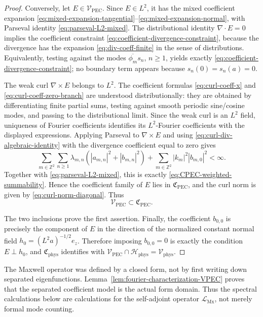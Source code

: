 \documentclass[11pt]{article}
\providecommand{\Z}{\mathbb{Z}}
\providecommand{\abs}[1]{\left\lvert #1\right\rvert}
\providecommand{\paren}[1]{\left(#1\right)}
\providecommand{\Hphys}{\mathcal H_{\mathrm{phys}}}
\providecommand{\VPEC}{\mathcal V_{\mathrm{PEC}}}
\providecommand{\Vphys}{\mathcal V_{\mathrm{phys}}}
\providecommand{\hzero}{h_0}
\providecommand{\LMx}{\mathcal L_{\mathrm{Mx}}}
\numberwithin{equation}{section}
\begin{document}
\begin{proof}
Conversely, let \(E\in\VPEC\).  Since \(E\in L^2\), it has the mixed coefficient expansion \eqref{eq:mixed-expansion-tangential}--\eqref{eq:mixed-expansion-normal}, with Parseval identity \eqref{eq:parseval-L2-mixed}.  The distributional identity \(\nabla\cdot E=0\) implies the coefficient constraint \eqref{eq:coefficient-divergence-constraint}, because the divergence has the expansion \eqref{eq:div-coeff-finite} in the sense of distributions.  Equivalently, testing against the modes \(\overline{\phi_m}s_n\), \(n\ge1\), yields exactly \eqref{eq:coefficient-divergence-constraint}; no boundary term appears because \(s_n(0)=s_n(a)=0\).

The weak curl \(\nabla\times E\) belongs to \(L^2\).  The coefficient formulas
\eqref{eq:curl-coeff-x} and \eqref{eq:curl-coeff-zero-branch} are understood
distributionally: they are obtained by differentiating finite partial sums,
testing against smooth periodic sine/cosine modes, and passing to the
distributional limit.  Since the weak curl is an \(L^2\) field, uniqueness of
Fourier coefficients identifies its \(L^2\)-Fourier coefficients with the
displayed expressions.  Applying Parseval to \(\nabla\times E\) and using
\eqref{eq:curl-div-algebraic-identity} with the divergence coefficient equal to
zero gives
\[
    \sum_{m\in\Z^2}\sum_{n\ge1}
    \lambda_{m,n}
    \paren{\abs{a_{m,n}}^2+\abs{b_{m,n}}^2}
    +
    \sum_{m\in\Z^2}\abs{k_m}^2\abs{b_{m,0}}^2
    <\infty .
\]
Together with \eqref{eq:parseval-L2-mixed}, this is exactly \eqref{eq:CPEC-weighted-summability}.  Hence the coefficient family of \(E\) lies in \(\mathfrak C_{\mathrm{PEC}}\), and the curl norm is given by \eqref{eq:curl-norm-diagonal}.  Thus
\[
    \VPEC\subset\mathfrak C_{\mathrm{PEC}} .
\]

The two inclusions prove the first assertion.  Finally, the coefficient \(b_{0,0}\) is precisely the component of \(E\) in the direction of the normalized constant normal field \(\hzero=(L^2a)^{-1/2}e_z\).  Therefore imposing \(b_{0,0}=0\) is exactly the condition \(E\perp\hzero\), and \(\mathfrak C_{\mathrm{phys}}\) identifies with \(\VPEC\cap\Hphys=\Vphys\).
\end{proof}

\begin{remark}
\label{rem:why-coeff-lemma-needed}
The Maxwell operator was defined by a closed form, not by first writing down separated eigenfunctions.  Lemma~\ref{lem:fourier-characterization-VPEC} proves that the separated coefficient model is the actual form domain.  Thus the spectral calculations below are calculations for the self-adjoint operator \(\LMx\), not merely formal mode counting.
\end{remark}
\end{document}
